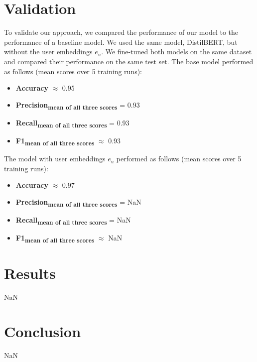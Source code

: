 \documentclass{article}
\begin{document}
\section{Validation}
To validate our approach, we compared the performance of our model to the performance of a baseline model. We used the same model, DistilBERT, but without the user embeddings $e_u$. We fine-tuned both models on the same dataset and compared their performance on the same test set. The base model performed as follows (mean scores over 5 training runs):
\begin{itemize} %
	\item \textbf{Accuracy} $\approx$ 0.95
	\item \textbf{Precision\textsubscript{\textnormal{mean of all three scores}}} = 0.93
	\item \textbf{Recall\textsubscript{\textnormal{mean of all three scores}}} = 0.93
	\item \textbf{F1\textsubscript{\textnormal{mean of all three scores}}} $\approx$ 0.93
\end{itemize}
The model with user embeddings $e_u$ performed as follows (mean scores over 5 training runs):
\begin{itemize}
	\item \textbf{Accuracy} $\approx$ 0.97
	\item \textbf{Precision\textsubscript{\textnormal{mean of all three scores}}} = NaN
	\item \textbf{Recall\textsubscript{\textnormal{mean of all three scores}}} = NaN
	\item \textbf{F1\textsubscript{\textnormal{mean of all three scores}}} $\approx$ NaN
\end{itemize}
\section{Results}
NaN

\section{Conclusion}
NaN

\printbibliography

\end{document}
